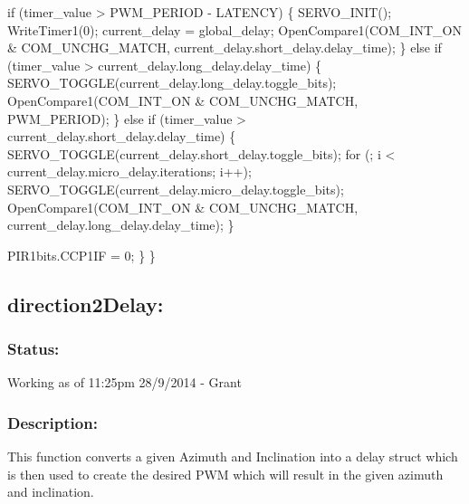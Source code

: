 \documentclass[]{article}
\begin{document}
		if (timer\_value > PWM\_PERIOD - LATENCY)\newline
		\{\newline
			SERVO\_INIT();\newline
			WriteTimer1(0);\newline
			current\_delay = global\_delay;\newline
			OpenCompare1(COM\_INT\_ON \& COM\_UNCHG\_MATCH, current\_delay.short\_delay.delay\_time);\newline
		\}\newline
		else if (timer\_value > current\_delay.long\_delay.delay\_time)\newline
		\{\newline
			SERVO\_TOGGLE(current\_delay.long\_delay.toggle\_bits);\newline
			OpenCompare1(COM\_INT\_ON \& COM\_UNCHG\_MATCH, PWM\_PERIOD); \newline
		\}\newline
		else if (timer\_value > current\_delay.short\_delay.delay\_time)\newline
		\{\newline
			SERVO\_TOGGLE(current\_delay.short\_delay.toggle\_bits);\newline
			for (; i < current\_delay.micro\_delay.iterations; i++);\newline
			SERVO\_TOGGLE(current\_delay.micro\_delay.toggle\_bits);\newline
			OpenCompare1(COM\_INT\_ON \& COM\_UNCHG\_MATCH, current\_delay.long\_delay.delay\_time);\newline
		\}\newline
		
		PIR1bits.CCP1IF = 0;\newline
	\}\newline
\}\newline

\subsection{direction2Delay:}
\subsubsection{Status:}
Working as of 11:25pm 28/9/2014 - Grant

\subsubsection{Description:}
This function converts a given Azimuth and Inclination into a delay struct which is then used to create the desired PWM which will result in the given azimuth and inclination.
\end{document}
